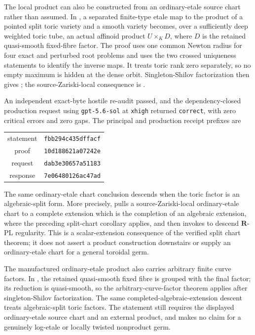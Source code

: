 The local product can also be constructed from an ordinary-etale source
chart rather than assumed.  In
, a separated finite-type etale map to
the product of a pointed split toric variety and a smooth variety becomes,
over a sufficiently deep weighted toric tube, an actual affinoid product
\(
 U\times_KD
\), where \(D\) is the retained quasi-smooth fixed-fibre factor.  The proof
uses one common Newton radius for four exact and perturbed root problems and
uses the two crossed uniqueness statements to identify the inverse maps.
It treats toric rank zero separately, so no empty maximum is hidden at the
dense orbit.  Singleton-Shilov factorization then gives
; the source-Zariski-local
consequence is .

An independent exact-byte hostile re-audit passed, and the dependency-closed
production request using \texttt{gpt-5.6-sol} at \texttt{xhigh} returned
\texttt{correct}, with zero critical errors and zero gaps.  The principal
and production receipt prefixes are
\begin{center}
  \small
  \begin{tabular}{@{}cc@{}}
    statement & \texttt{fbb294c435dffacf} \\
    proof & \texttt{10d188621a07242e} \\
    request & \texttt{dab3e30657a51183} \\
    response & \texttt{7e06480126ac47ad}
  \end{tabular}
\end{center}

The same ordinary-etale chart conclusion descends when the toric factor is an
algebraic-split form.  More precisely,
 pulls a
source-Zariski-local ordinary-etale chart to a complete extension which is
the completion of an algebraic extension, where the preceding split-chart
corollary applies, and then invokes \cite[Corollary~5.12]{GJR26} to descend
\(\mathbf R\)-PL regularity.  This is a scalar-extension consequence of the
verified split chart theorem; it does not assert a product construction
downstairs or supply an ordinary-etale chart for a general toroidal germ.

The manufactured ordinary-etale product also carries arbitrary finite curve
factors.  In
, the retained
quasi-smooth fixed fibre is grouped with the final factor; its reduction is
quasi-smooth, so the arbitrary-curve-factor theorem applies after
singleton-Shilov factorization.  The same completed-algebraic-extension
descent treats algebraic-split toric factors.  The statement still requires
the displayed ordinary-etale source chart and an external product, and makes
no claim for a genuinely log-etale or locally twisted nonproduct germ.

